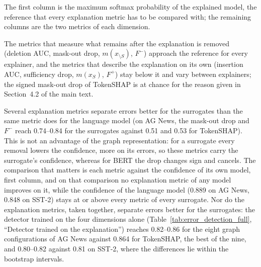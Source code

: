 \documentclass[3p,times,10pt,nopreprintline]{elsarticle}
\begin{document}
The first column is the maximum softmax probability of the explained model, the reference that every explanation metric has to be compared with; the remaining columns are the two metrics of each dimension.

The metrics that measure what remains after the explanation is removed (deletion AUC, mask-out drop, \(m(x_{\setminus S})\), \(F^{-}\)) approach the reference for every explainer, and the metrics that describe the explanation on its own (insertion AUC, sufficiency drop, \(m(x_S)\), \(F^{+}\)) stay below it and vary between explainers; the signed mask-out drop of TokenSHAP is at chance for the reason given in Section~4.2 of the main text.

Several explanation metrics separate errors better for the surrogates than the same metric does for the language model (on AG News, the mask-out drop and \(F^{-}\) reach 0.74--0.84 for the surrogates against 0.51 and 0.53 for TokenSHAP). This is not an advantage of the graph representation: for a surrogate every removal lowers the confidence, more on its errors, so these metrics carry the surrogate's confidence, whereas for BERT the drop changes sign and cancels. The comparison that matters is each metric against the confidence of its own model, first column, and on that comparison no explanation metric of any model improves on it, while the confidence of the language model (0.889 on AG News, 0.848 on SST-2) stays at or above every metric of every surrogate. Nor do the explanation metrics, taken together, separate errors better for the surrogates: the detector trained on the four dimensions alone (Table~\ref{tab:error_detection_full}, ``Detector trained on the explanation'') reaches 0.82--0.86 for the eight graph configurations of AG News against 0.864 for TokenSHAP, the best of the nine, and 0.80--0.82 against 0.81 on SST-2, where the differences lie within the bootstrap intervals.

\begin{table}[H]
\centering
\scriptsize
\setlength{\tabcolsep}{3pt}
\caption{Error-oriented AUROC of individual explanation metrics used alone as an error score (gold-label errors, 10-fold out-of-fold), next to the maximum softmax probability (MSP) of the explained model, for each explainer--representation configuration. \(m(x_{\setminus S})\) and \(m(x_S)\): margin after removing the explanation and margin of the explanation alone (Dimension~3); \(F^{-}\) and \(F^{+}\): necessity and sufficiency (Dimension~4).}
\label{tab:single_feature}
\end{table}
\end{document}
